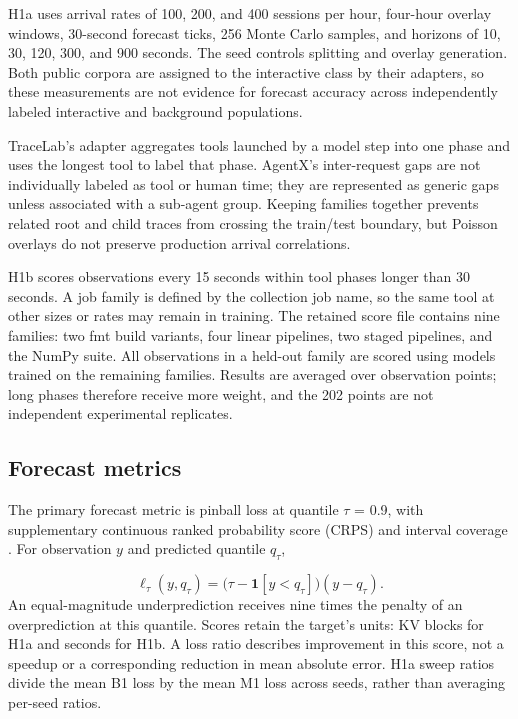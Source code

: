 \documentclass[11pt,a4paper]{article}
\begin{document}
H1a uses arrival rates of 100, 200, and 400 sessions per hour, four-hour overlay windows, 30-second forecast ticks, 256 Monte Carlo samples, and horizons of 10, 30, 120, 300, and 900 seconds. The seed controls splitting and overlay generation. Both public corpora are assigned to the interactive class by their adapters, so these measurements are not evidence for forecast accuracy across independently labeled interactive and background populations.


TraceLab's adapter aggregates tools launched by a model step into one phase and uses the longest tool to label that phase. AgentX's inter-request gaps are not individually labeled as tool or human time; they are represented as generic gaps unless associated with a sub-agent group. Keeping families together prevents related root and child traces from crossing the train/test boundary, but Poisson overlays do not preserve production arrival correlations.


H1b scores observations every 15 seconds within tool phases longer than 30 seconds. A job family is defined by the collection job name, so the same tool at other sizes or rates may remain in training. The retained score file contains nine families: two fmt build variants, four linear pipelines, two staged pipelines, and the NumPy suite. All observations in a held-out family are scored using models trained on the remaining families. Results are averaged over observation points; long phases therefore receive more weight, and the 202 points are not independent experimental replicates.


\subsection{Forecast metrics}
\label{sec:5.2}
The primary forecast metric is pinball loss at quantile \emph{\(\tau\)} = 0.9, with supplementary continuous ranked probability score (CRPS) and interval coverage \citep{r9}. For observation \(y\) and predicted quantile \(q_\tau\),


\begin{equation}
\ell_\tau(y,q_\tau)=\bigl(\tau-\mathbf{1}[y<q_\tau]\bigr)(y-q_\tau).
\label{eq:4}
\end{equation}
An equal-magnitude underprediction receives nine times the penalty of an overprediction at this quantile. Scores retain the target's units: KV blocks for H1a and seconds for H1b. A loss ratio describes improvement in this score, not a speedup or a corresponding reduction in mean absolute error. H1a sweep ratios divide the mean B1 loss by the mean M1 loss across seeds, rather than averaging per-seed ratios.
\end{document}
